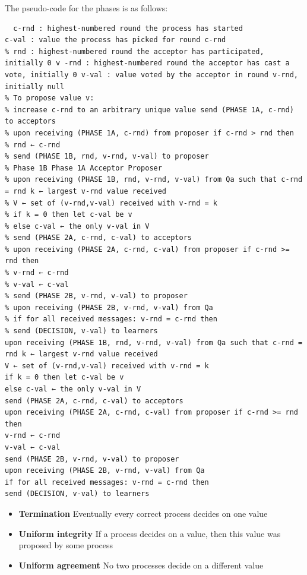 The pseudo-code for the phases is as follows:
\begin{verbatim}
  c-rnd : highest-numbered round the process has started
c-val : value the process has picked for round c-rnd
% rnd : highest-numbered round the acceptor has participated, initially 0 v -rnd : highest-numbered round the acceptor has cast a vote, initially 0 v-val : value voted by the acceptor in round v-rnd, initially null
% To propose value v:
% increase c-rnd to an arbitrary unique value send (PHASE 1A, c-rnd) to acceptors
% upon receiving (PHASE 1A, c-rnd) from proposer if c-rnd > rnd then
% rnd ← c-rnd
% send (PHASE 1B, rnd, v-rnd, v-val) to proposer
% Phase 1B Phase 1A Acceptor Proposer
% upon receiving (PHASE 1B, rnd, v-rnd, v-val) from Qa such that c-rnd = rnd k ← largest v-rnd value received
% V ← set of (v-rnd,v-val) received with v-rnd = k
% if k = 0 then let c-val be v
% else c-val ← the only v-val in V
% send (PHASE 2A, c-rnd, c-val) to acceptors
% upon receiving (PHASE 2A, c-rnd, c-val) from proposer if c-rnd >= rnd then
% v-rnd ← c-rnd
% v-val ← c-val
% send (PHASE 2B, v-rnd, v-val) to proposer
% upon receiving (PHASE 2B, v-rnd, v-val) from Qa
% if for all received messages: v-rnd = c-rnd then
% send (DECISION, v-val) to learners
upon receiving (PHASE 1B, rnd, v-rnd, v-val) from Qa such that c-rnd = rnd k ← largest v-rnd value received
V ← set of (v-rnd,v-val) received with v-rnd = k
if k = 0 then let c-val be v
else c-val ← the only v-val in V
send (PHASE 2A, c-rnd, c-val) to acceptors
upon receiving (PHASE 2A, c-rnd, c-val) from proposer if c-rnd >= rnd then
v-rnd ← c-rnd
v-val ← c-val
send (PHASE 2B, v-rnd, v-val) to proposer
upon receiving (PHASE 2B, v-rnd, v-val) from Qa
if for all received messages: v-rnd = c-rnd then
send (DECISION, v-val) to learners
\end{verbatim}

\begin{itemize}
  \item \textbf{Termination} Eventually every correct process decides on one value
  \item \textbf{Uniform integrity} If a process decides on a value, then this value was proposed by some process
  \item \textbf{Uniform agreement} No two processes decide on a different value
  \end{itemize}

